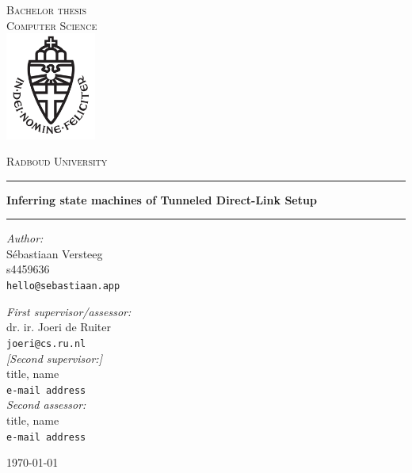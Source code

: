 \documentclass[11pt,a4paper]{report}
\begin{document}
\begin{titlepage}
\begin{center}
\textsc{\LARGE Bachelor thesis\\Computer Science}\\[1.5cm]
\includegraphics[height=100pt]{logo}

\vspace{0.4cm}
\textsc{\Large Radboud University}\\[1cm]
\hrule
\vspace{0.4cm}
\textbf{\huge Inferring state machines of Tunneled Direct-Link Setup}\\[0.4cm]
\hrule
\vspace{2cm}
\begin{minipage}[t]{0.45\textwidth}
\begin{flushleft} \large
\textit{Author:}\\
S\'ebastiaan Versteeg\\
s4459636\\
\texttt{hello@sebastiaan.app}\\
\end{flushleft}
\end{minipage}
\begin{minipage}[t]{0.45\textwidth}
\begin{flushright} \large
\textit{First supervisor/assessor:}\\
dr. ir. Joeri de Ruiter\\
\texttt{joeri@cs.ru.nl}\\[1.3cm]
\textit{[Second supervisor:]}\\
title, name\\
\texttt{e-mail address}\\[1.3cm]
\textit{Second assessor:}\\
title, name\\
\texttt{e-mail address}
\end{flushright}
\end{minipage}
\vfill
{\large \today}
\end{center}
\end{titlepage}



\tableofcontents











\begin{appendices}

\end{appendices}
\end{document}
